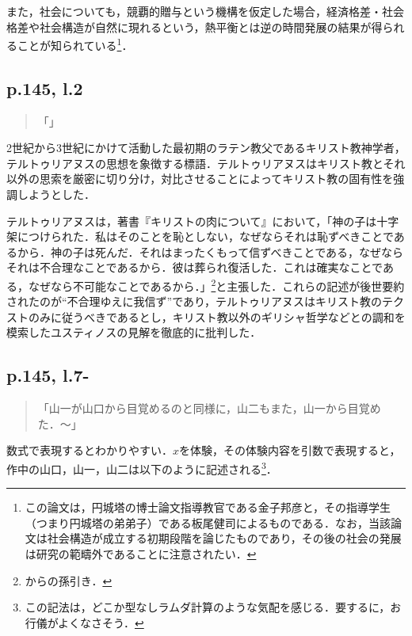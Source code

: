\documentclass[10pt, a5paper, twoside]{jsarticle}
\theoremstyle{definition}
\begin{document}
			また，社会についても，競覇的贈与という機構を仮定した場合，経済格差・社会格差や社会構造が自然に現れるという，熱平衡とは逆の時間発展の結果が得られることが知られている\cite{knk}\footnote{この論文は，円城塔の博士論文指導教官である金子邦彦と，その指導学生（つまり円城塔の弟弟子）である板尾健司によるものである．なお，当該論文は社会構造が成立する初期段階を論じたものであり，その後の社会の発展は研究の範疇外であることに注意されたい．}．

		\subsection{p.145, l.2}

			\begin{quote}
				
				「」

			\end{quote}

			2世紀から3世紀にかけて活動した最初期のラテン教父であるキリスト教神学者，テルトゥリアヌスの思想を象徴する標語．テルトゥリアヌスはキリスト教とそれ以外の思索を厳密に切り分け，対比させることによってキリスト教の固有性を強調しようとした．

			テルトゥリアヌスは，著書『キリストの肉について』において，「神の子は十字架につけられた．私はそのことを恥としない，なぜならそれは恥ずべきことであるから．神の子は死んだ．それはまったくもって信ずべきことである，なぜならそれは不合理なことであるから．彼は葬られ復活した．これは確実なことである，なぜなら不可能なことであるから．」\footnote{\cite{phil}からの孫引き．}と主張した．これらの記述が後世要約されたのが“不合理ゆえに我信ず”であり，テルトゥリアヌスはキリスト教のテクストのみに従うべきであるとし，キリスト教以外のギリシャ哲学などとの調和を模索したユスティノスの見解を徹底的に批判した．

		\subsection{p.145, l.7-}

			\begin{quote}
				
				「山一が山口から目覚めるのと同様に，山二もまた，山一から目覚めた．〜」

			\end{quote}

			数式で表現するとわかりやすい．$x$を体験，その体験内容を引数で表現すると，作中の山口，山一，山二は以下のように記述される\footnote{この記法は，どこか型なしラムダ計算のような気配を感じる．要するに，お行儀がよくなさそう．}．
\end{document}
